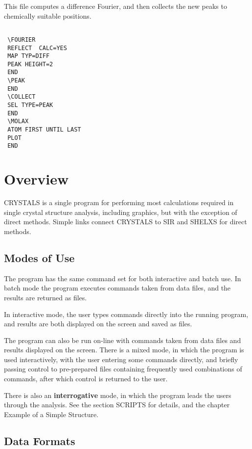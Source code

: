 \documentclass[10pt,a4paper]{report}
\begin{document}
\bigskip{}


 This file computes a difference Fourier, and then collects the new
 peaks to chemically suitable positions.

\small\begin{verbatim}

 \FOURIER
 REFLECT  CALC=YES
 MAP TYP=DIFF
 PEAK HEIGHT=2
 END
 \PEAK
 END
 \COLLECT
 SEL TYPE=PEAK
 END
 \MOLAX
 ATOM FIRST UNTIL LAST
 PLOT
 END
\end{verbatim}\normalsize





\chapter{Overview}


CRYSTALS is a single program for performing most calculations required in single crystal structure analysis, including graphics, but  with the exception of direct methods. Simple links connect CRYSTALS to SIR and  SHELXS for direct methods.

\section{Modes of Use}


The program has the same command set for both interactive and batch use.
 In batch mode the program executes commands taken from  data files,
 and the  results are returned as files.


In interactive mode, the user types commands directly into the running
 program, and results are both displayed on the screen and saved as files.


The program can also be run on-line with commands taken from data
 files and results displayed on the screen.
 There is a mixed mode, in which the program is used interactively,
 with the user entering some commands directly, and briefly passing control
 to pre-prepared files containing frequently used combinations of commands,
 after which control is returned to the user.


There is also an {\bf interrogative} mode, in which the program leads
 the users through the analysis. See the section  SCRIPTS for details,
and the chapter Example of a Simple Structure.



\section{Data Formats}
\end{document}
